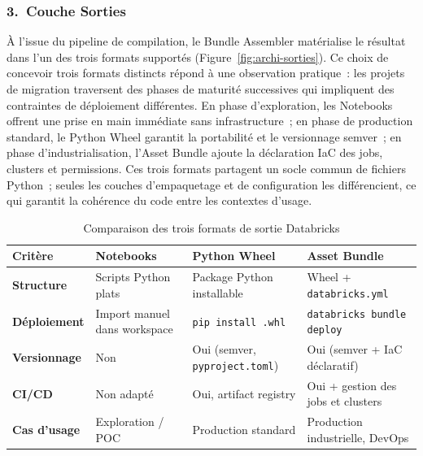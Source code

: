 \subsubsection*{3.\ Couche Sorties}

À l'issue du pipeline de compilation, le Bundle Assembler matérialise le résultat dans l'un des trois formats supportés (Figure~\ref{fig:archi-sorties}). Ce choix de concevoir trois formats distincts répond à une observation pratique~: les projets de migration traversent des phases de maturité successives qui impliquent des contraintes de déploiement différentes. En phase d'exploration, les Notebooks offrent une prise en main immédiate sans infrastructure~; en phase de production standard, le Python Wheel garantit la portabilité et le versionnage semver~; en phase d'industrialisation, l'Asset Bundle ajoute la déclaration IaC des jobs, clusters et permissions. Ces trois formats partagent un socle commun de fichiers Python~; seules les couches d'empaquetage et de configuration les différencient, ce qui garantit la cohérence du code entre les contextes d'usage.



\begin{table}[H]
\centering
\caption{Comparaison des trois formats de sortie Databricks}
\label{tab:formats-sortie}
\begin{tabularx}{\textwidth}{lXXX}
\toprule
\textbf{Critère} & \textbf{Notebooks} & \textbf{Python Wheel} & \textbf{Asset Bundle} \\
\midrule
\textbf{Structure} & Scripts Python plats & Package Python installable & Wheel + \texttt{databricks.yml} \\
\addlinespace
\textbf{Déploiement} & Import manuel dans workspace & \texttt{pip install .whl} & \texttt{databricks bundle deploy} \\
\addlinespace
\textbf{Versionnage} & Non & Oui (semver, \texttt{pyproject.toml}) & Oui (semver + IaC déclaratif) \\
\addlinespace
\textbf{CI/CD} & Non adapté & Oui, artifact registry & Oui + gestion des jobs et clusters \\
\addlinespace
\textbf{Cas d'usage} & Exploration / POC & Production standard & Production industrielle, DevOps \\
\bottomrule
\end{tabularx}
\end{table}

